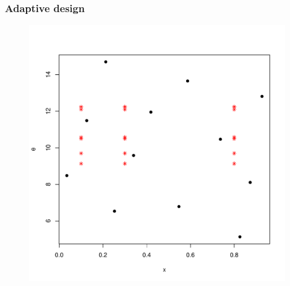\documentclass[nopagenumber,9pt]{beamer}
\begin{document}
\begin{frame}
 \frametitle{Adaptive design}
 
 \begin{center}
  \begin{figure}
   \includegraphics[scale=.3]{design_algo1.pdf}
  \end{figure}

 \end{center}
\end{frame}
\end{document}
